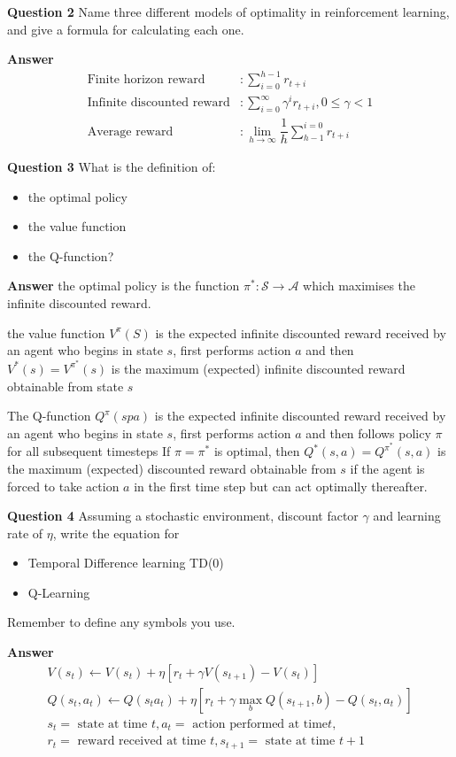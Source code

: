 \documentclass[11pt]{article}
\begin{document}
\textbf{Question 2}
Name three different models of optimality in reinforcement learning, and give
a formula for calculating each one.

\textbf{Answer}
\[
\begin{aligned}
    \text{Finite horizon reward} &: \sum_{i=0}^{h-1} r_{t+i} \\
    \text{Infinite discounted reward} &: \sum_{i=0}^{\infty} \gamma^i r_{t+i}, 0 \leq \gamma < 1 \\
    \text{Average reward} &: \lim_{h \to \infty} \dfrac{1}{h} \sum_{h-1}^{i=0} r_{t+i}
\end{aligned}
\]

\textbf{Question 3}
What is the definition of:
\begin{itemize}
    \item the optimal policy
    \item the value function
    \item the Q-function?
\end{itemize}

\textbf{Answer}
the optimal policy is the function $\pi^* : \mathcal{S} \to \mathcal{A}$ which maximises the infinite discounted reward.

the value function $V^{\pi}(S)$ is the expected infinite discounted reward
received by an agent who begins in state $s$, first performs action $a$ and
then $V^*(s) = V^{\pi^*}(s)$ is the maximum (expected) infinite discounted
reward obtainable from state $s$

The Q-function $Q^{\pi}(spa)$ is the expected infinite discounted reward
received by an agent who begins in state $s$, first performs action $a$ and
then follows policy $\pi$ for all subsequent timesteps If $\pi = \pi^*$ is
optimal, then $Q^*(s,a) = Q^{\pi}^* (s,a)$ is the maximum (expected) discounted
reward obtainable from $s$ if the agent is forced to take action $a$ in the
first time step but can act optimally thereafter.

\textbf{Question 4}
Assuming a stochastic environment, discount factor $\gamma$ and learning rate
of $\eta$, write the equation for
\begin{itemize}
    \item Temporal Difference learning TD(0)
    \item Q-Learning
\end{itemize}
Remember to define any symbols you use.

\textbf{Answer}
\begin{gather*}
    V(s_t) \leftarrow V(s_t) + \eta [r_t + \gamma V (s_{t + 1}) - V(s_{t})]\\
    Q(s_t, a_t ) \leftarrow Q(s_t a_t) + \eta [r_t + \gamma \max_b Q(s_{t+1}, b)- Q(s_t, a_t)]\\
    s_t = \text{ state at time } t, a_t = \text{ action performed at time} t, \\
    r_t = \text{ reward received at time }t, s_{t+1} = \text{ state at time } t + 1 \\
\end{gather*}
\end{document}
